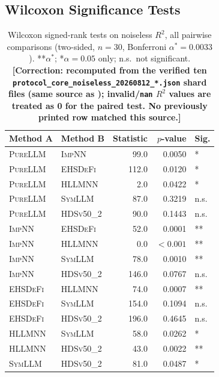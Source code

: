 \documentclass[twoside,11pt]{article}
\newcommand{\PureLLM}{\textsc{PureLLM}}
\newcommand{\INN}{\textsc{ImpNN}}
\newcommand{\EHD}{\textsc{EHSDeFi}}
\newcommand{\HSL}{\textsc{HLLMNN}}
\newcommand{\SEL}{\textsc{SymLLM}}
\newcommand{\HDS}{\textsc{HDSv50\_2}}
\newcommand{\Rsq}{R^{2}}
\begin{document}
\subsection{Wilcoxon Significance Tests}
\label{sec:noiseless:wilcoxon}

\begin{table}[ht]
\centering
\caption{Wilcoxon signed-rank tests on noiseless $\Rsq$, all pairwise
         comparisons (two-sided, $n=30$, Bonferroni $\alpha^*=0.0033$).
         **$\alpha^*$; *$\alpha=0.05$ only; n.s.~not significant.
         \textbf{[Correction: recomputed from the verified ten
         \texttt{protocol\_core\_noiseless\_20260812\_*.json} shard files
         (same source as ); invalid/\texttt{nan} $\Rsq$
         values are treated as 0 for the paired test. No previously
         printed row matched this source.]}}
\label{tab:wilcoxon}
\small
\begin{tabular}{llrrl}
\toprule
\textbf{Method A} & \textbf{Method B} & \textbf{Statistic} &
  \textbf{$p$-value} & \textbf{Sig.} \\
\midrule
\PureLLM & \INN  &  99.0 &  0.0050  & *  \\
\PureLLM & \EHD  & 112.0 &  0.0120  & *  \\
\PureLLM & \HSL  &   2.0 &  0.0422  & *  \\
\PureLLM & \SEL  &  87.0 &  0.3219  & n.s. \\
\PureLLM & \HDS  &  90.0 &  0.1443  & n.s. \\
\midrule
\INN     & \EHD  &  52.0 &  0.0001  & ** \\
\INN     & \HSL  &   0.0 & $<0.001$ & ** \\
\INN     & \SEL  &  78.0 &  0.0010  & ** \\
\INN     & \HDS  & 146.0 &  0.0767  & n.s. \\
\midrule
\EHD     & \HSL  &  74.0 &  0.0007  & ** \\
\EHD     & \SEL  & 154.0 &  0.1094  & n.s. \\
\EHD     & \HDS  & 196.0 &  0.4645  & n.s. \\
\midrule
\HSL     & \SEL  &  58.0 &  0.0262  & *  \\
\HSL     & \HDS  &  43.0 &  0.0022  & ** \\
\SEL     & \HDS  &  81.0 &  0.0487  & *  \\
\bottomrule
\end{tabular}
\end{table}

\end{document}
